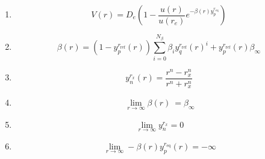 \documentclass{article}
\begin{document}
\begin{enumerate}

\item \begin{equation} V(r)=D_e(1-\frac{u(r)}{u(r_e)}e^{-\beta(r)y_p^{r_\textrm{eq}}}) \end{equation}

\item \begin{equation} \beta(r)=(1-y_p^{r_\textrm{{ref}}}(r))\sum_{i=0}^{N_\beta}\beta_iy_q^{r_\textrm{{ref}}}(r)^i+y_p^{r_\textrm{{ref}}}(r)\beta_\infty\end{equation}

\item \begin{equation} y_n^{r_x}(r)=\frac{r^n-r_x^n}{r^n+r_x^n} \end{equation}

\item \begin{equation} \ \lim_{r\to\infty} \beta(r) \ = \beta_\infty \end{equation}

\item \begin{equation} \ \lim_{r\to\infty} y_n^{r_x} = 0 \end{equation}

\item \begin{equation} \ \lim_{r\to\infty} -\beta(r)y_p^{r_\textrm{eq}}(r) = -\infty \end{equation}



\end{enumerate}
\end{document}
